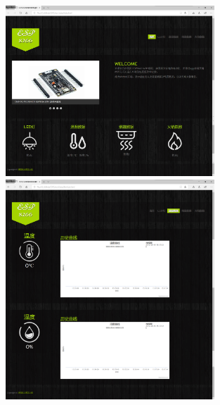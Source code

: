 \begin{figure}[h]
    \centering
    \begin{minipage}{0.4\textwidth}
        \centering
        \includegraphics[width=0.7\textwidth]{figures/test/4}   
    \end{minipage}
    \begin{minipage}{0.4\textwidth}
        \centering
        \includegraphics[width=0.7\textwidth]{figures/test/6}   
    \end{minipage}
    \vspace{\baselineskip} 
    

\end{figure}
